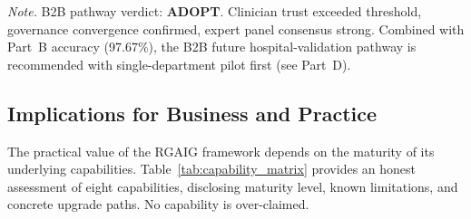 \vspace{2pt}
\noindent\textit{Note.} B2B pathway verdict: \textbf{ADOPT}. Clinician trust exceeded threshold, governance convergence confirmed, expert panel consensus strong. Combined with Part~B accuracy (97.67\%), the B2B future hospital-validation pathway is recommended with single-department pilot first (see Part~D).

\subsection{Implications for Business and Practice}

The practical value of the RGAIG framework depends on the maturity of its underlying capabilities. Table~\ref{tab:capability_matrix} provides an honest assessment of eight capabilities, disclosing maturity level, known limitations, and concrete upgrade paths. No capability is over-claimed.

